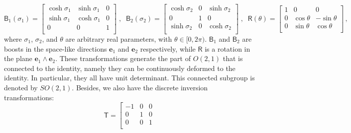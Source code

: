 \documentclass[twocolumn,prd,aps,showpacs,showkeys,amsmath,amssymb]{revtex4-1}
\newcommand{\bl}{\boldsymbol}
\begin{document}
\begin{widetext}
\begin{equation*}
  \textsf{B}_1(\sigma_1) = \left[
                     \begin{array}{ccc}
                       \cosh\sigma_1 & \sinh\sigma_1 & 0 \\
                       \sinh\sigma_1 & \cosh\sigma_1 & 0 \\
                       0 & 0 & 1 \\
                     \end{array}
                   \right]\;,\;\;
   \textsf{B}_2(\sigma_2) = \left[
                     \begin{array}{ccc}
                       \cosh\sigma_2 & 0 & \sinh\sigma_2 \\
                       0 & 1 & 0 \\
                       \sinh\sigma_2 & 0 & \cosh\sigma_2 \\
                     \end{array}
                   \right]\;,\;\;
     \textsf{R}(\theta) = \left[
                     \begin{array}{ccc}
                       1 & 0 & 0 \\
                       0 & \cos\theta & -\sin\theta \\
                       0 & \sin\theta & \cos\theta \\
                     \end{array}
                   \right]  \,,
\end{equation*}
where $\sigma_1$,  $\sigma_2$, and $\theta$ are arbitrary real parameters, with $\theta\in[0,2\pi)$. $\textsf{B}_1$ and $\textsf{B}_2$ are boosts in the space-like directions $\bl{e}_1$ and $\bl{e}_2$ respectively, while $\textsf{R}$ is a rotation in the plane $\bl{e}_1\wedge\bl{e}_2$. These transformations generate the part of $O(2,1)$ that is connected to the identity, namely they can be continuously deformed to the identity. In particular, they all have unit determinant. This connected subgroup is denoted by $SO(2,1)$. Besides, we also have the discrete inversion transformations:
\begin{equation*}
 \textsf{T} = \left[
                     \begin{array}{ccc}
                       -1 & 0 & 0 \\
                       0 & 1 & 0 \\
                       0 & 0 & 1 \\

\end{array}
\end{equation*}
\end{widetext}
\end{document}
